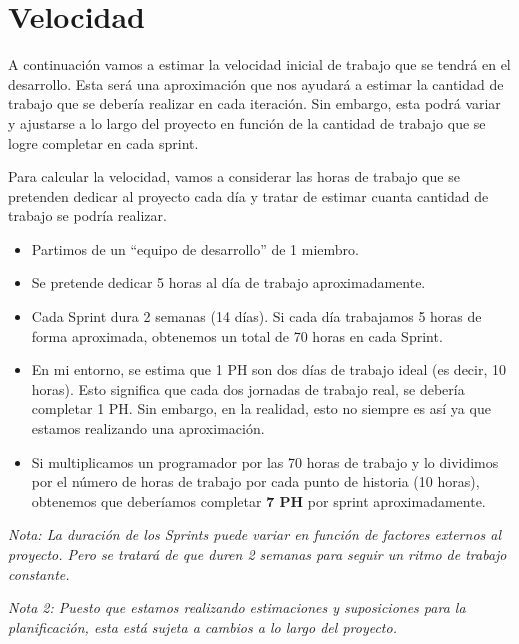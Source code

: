 \section{Velocidad}
A continuación vamos a estimar la velocidad inicial de trabajo que se tendrá en el desarrollo. Esta será una aproximación
que nos ayudará a estimar la cantidad de trabajo que se debería realizar en cada iteración. Sin embargo, esta podrá variar
y ajustarse a lo largo del proyecto en función de la cantidad de trabajo que se logre completar en cada sprint.

Para calcular la velocidad, vamos a considerar las horas de trabajo que se pretenden dedicar al proyecto cada día y tratar
de estimar cuanta cantidad de trabajo se podría realizar.

\begin{itemize}
    \item Partimos de un ``equipo de desarrollo'' de 1 miembro.
    \item Se pretende dedicar 5 horas al día de trabajo aproximadamente.
    \item Cada Sprint dura 2 semanas (14 días). Si cada día trabajamos 5 horas de forma aproximada, obtenemos un total de 70 horas
          en cada Sprint.
    \item En mi entorno, se estima que 1 PH son dos días de trabajo ideal (es decir, 10 horas).
          Esto significa que cada dos jornadas de trabajo real, se debería completar 1 PH. Sin embargo, en la realidad, esto no siempre
          es así ya que estamos realizando una aproximación.
    \item Si multiplicamos un programador por las 70 horas de trabajo y lo dividimos por el número de horas de trabajo por cada punto de historia
          (10 horas), obtenemos que deberíamos completar \textbf{7 PH} por sprint aproximadamente.
\end{itemize}

\textit{Nota: La duración de los Sprints puede variar en función de factores externos al proyecto. Pero se tratará de que duren
    2 semanas para seguir un ritmo de trabajo constante.}
    
\textit{Nota 2: Puesto que estamos realizando estimaciones y suposiciones para la planificación, esta está sujeta a cambios a
    lo largo del proyecto.}

